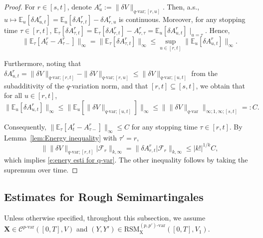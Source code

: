 \documentclass[11pt,reqno]{amsart}
\numberwithin{equation}{section}
\def\E{\mathbb E}
\begin{document}
\begin{proof}
For $r \in [s,t]$, denote $A^r_u := \|\delta V\|_{q\text{-}\mathrm{var};[r,u]}$. Then, a.s., $u \mapsto \E_{u} [\delta A^r_{u,t}] = \E_{u} [\delta A^r_{r,t}] - \delta A^r_{r,u}$ is continuous. Moreover, for any stopping time $\tau \in [r,t]$, $\E_{\tau}[\delta A^{r}_{\tau,t}] = \E_{\tau}[\delta A^{r}_{r,t}] - A^r_{r,\tau} = \E_{u} [\delta A^r_{u,t}] \mid_{u = \tau}$. Hence, 
\begin{equation*}
\|\E_{\tau} [A^{r}_{t} - A^{r}_{\tau-} ]\|_{\infty} = \|\E_{\tau} [\delta A^{r}_{\tau,t} ]\|_{\infty} \le \sup_{u \in [r,t]} \| \E_u[\delta A^r_{u,t}] \|_{\infty}.
\end{equation*}

Furthermore, noting that $\delta A^r_{u,t} = \|\delta V\|_{q\text{-}\mathrm{var};[r,t]} - \|\delta V\|_{q\text{-}\mathrm{var};[r,u]} \le \|\delta V\|_{q\text{-}\mathrm{var};[u,t]}$ from the subadditivity of the $q$-variation norm, and that $[r,t] \subseteq [s,t]$, we obtain that for all $u \in [r,t]$, 
\begin{equation*}
\big\| \E_{u}[\delta A^{r}_{u,t}] \big\|_{\infty} \le \big\| \E_{u}[ \|\delta V\|_{q\text{-}\mathrm{var};[u,t]} ] \big\|_{\infty} \le \big\| \|\delta V\|_{q\text{-}\mathrm{var}} \big\|_{\infty;1,\infty;[s,t]} =: C. 
\end{equation*}

Consequently, $\|\E_{\tau} [A^{r}_{t} - A^{r}_{\tau-} ]\|_{\infty} \le C$ for any stopping time $\tau \in [r,t]$. By Lemma~\ref{lem:Energy inequality} with $\tau' = r$, 
\begin{equation*}
\big\| \|\delta V\|_{q\text{-}\mathrm{var};[r,t]} \big| \mathcal F_{r} \big\|_{k,\infty} = \big\| \delta A^{r}_{r,t} \big| \mathcal F_{r} \big\|_{k,\infty} \le |k!|^{1/k} C, 
\end{equation*}
which implies \eqref{e:enery esti for q-var}. The other inequality follows by taking the supremum over time. 
\end{proof}


\subsection{Estimates for Rough Semimartingales}\label{subsec:estimates for rough semimartingales}

Unless otherwise specified, throughout this subsection, we assume $\mathbf X \in \mathscr{C}^{p\text{-}\mathrm{var}}([0,T],V)$ and $(Y,Y')\in \mathrm{RSM}^{(p,p')\text{-}\mathrm{var}}_{\mathrm X}([0,T],V_1)$. 
\end{document}
